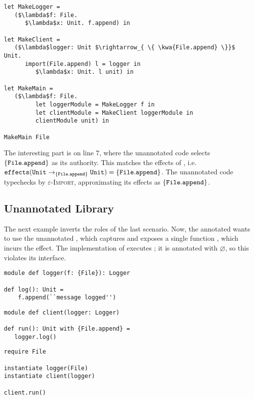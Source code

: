 \begin{lstlisting}
let MakeLogger =
   ($\lambda$f: File.
      $\lambda$x: Unit. f.append) in
          
let MakeClient =
   ($\lambda$logger: Unit $\rightarrow_{ \{ \kwa{File.append} \}}$ Unit.
      import(File.append) l = logger in
         $\lambda$x: Unit. l unit) in
          
let MakeMain =
   ($\lambda$f: File.
         let loggerModule = MakeLogger f in
         let clientModule = MakeClient loggerModule in
         clientModule unit) in

MakeMain File
\end{lstlisting}

The interesting part  is on line $7$, where the unannotated code selects $\{ \mathtt{File.append} \}$ as its authority. This matches the effects of , i.e.
 $\mathtt{effects}(\mathtt{Unit} \rightarrow_{\{\mathtt{File.append}\}} \mathtt{Unit}) = \{
 \mathtt{File.append} \}$. The unannotated code typechecks by \textsc{$\varepsilon$-Import}, approximating its effects as $\mathtt{\{ \mathtt{File.append} \}}$.

\vspace{-0.5cm}
\subsection{Unannotated Library}
\vspace{-0.2cm}

The next example inverts the roles of the last scenario. Now, the annotated 
 wants to use the unannotated , which captures 
 and exposes a single function , which incurs the
  effect. The implementation of  executes
 ; it is annotated with $\varnothing$, so this violates its interface.

\begin{lstlisting}
module def logger(f: {File}): Logger

def log(): Unit =
    f.append(``message logged'')
\end{lstlisting}

\begin{lstlisting}
module def client(logger: Logger)

def run(): Unit with {File.append} =
   logger.log()
\end{lstlisting}

\begin{lstlisting}
require File

instantiate logger(File)
instantiate client(logger)

client.run()
\end{lstlisting}

